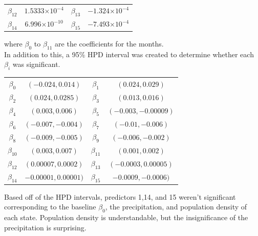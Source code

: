 \documentclass[12pt, onesided]{article}
\providecommand{\e}[1]{\ensuremath{\times 10^{#1}}}
\begin{document}
\begin{flushleft}
\begin{center}
\begin{tabular}{cc|cc}
$\beta_{12}$ & $1.5333 \e{-4}$ & $\beta_{13}$ & $-1.324\e{-4}$ \\
$\beta_{14}$ & $6.996 \e{-10}$ & $\beta_{15}$ & $-7.493\e{-4}$ \\
\end{tabular}
\end{center}
where $\beta_0$ to $\beta_{11}$ are the coefficients for the months. \\
In addition to this, a 95\% HPD interval was created to determine whether each $\beta_i$ was significant.
\begin{center}
\begin{tabular}{cc|cc}
$\beta_0$ & $(-0.024,0.014)$ & $\beta_1$ & $(0.024,0.029)$ \\
$\beta_2$ & $(0.024, 0.0285)$ & $\beta_3$ & $(0.013,0.016)$ \\
$\beta_4$ & $(0.003,0.006)$ & $\beta_5$ & $(-0.003,-0.00009)$ \\
$\beta_6$ & $(-0.007,-0.004)$ & $\beta_7$ & $(-0.01,-0.006)$ \\
$\beta_8$ & $(-0.009,-0.005)$ & $\beta_9$ & $(-0.006,-0.002)$ \\
$\beta_{10}$ & $(0.003,0.007)$ & $\beta_{11}$ & $(0.001,0.002)$ \\
$\beta_{12}$ & $(0.00007,0.0002)$ & $\beta_{13}$ & $(-0.0003,0.00005)$ \\
$\beta_{14}$ & $-0.00001,0.00001)$ & $\beta_{15}$ & $-0.0009,-0.0006)$ \\
\end{tabular}
\end{center}
Based off of the HPD intervals, predictors 1,14, and 15 weren't significant corresponding to the baseline $\beta_0$, the precipitation, and population density of each state. Population density is understandable, but the insignificance of the precipitation is surprising.\\


\end{flushleft}
\end{document}
